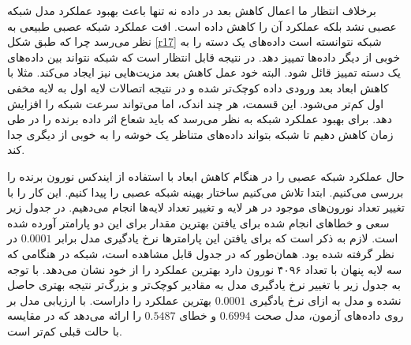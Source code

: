 \documentclass[12pt, a4paper]{article}
\begin{document}
\newpage

برخلاف انتظار ما اعمال کاهش بعد در داده‌ نه تنها باعث بهبود عملکرد مدل شبکه عصبی نشد بلکه عملکرد آن‌ را کاهش داده است.
افت عملکرد شبکه عصبی طبیعی به نظر می‌رسد چرا که طبق شکل \ref{r17} شبکه  نتوانسته‌ است داده‌های یک دسته
را به خوبی از دیگر داده‌ها تمییز دهد. در نتیجه قابل انتظار است که شبکه نتواند بین داده‌های یک دسته تمییز قائل شود.
البته خود عمل کاهش بعد مزیت‌هایی نیز ایجاد می‌کند. مثلا با کاهش ابعاد بعد ورودی داده کوچک‌تر شده و در نتیجه اتصالات لایه
اول به لایه‌ مخفی اول کم‌تر می‌شود. این قسمت، هر چند اندک، اما می‌تواند سرعت شبکه را افزایش دهد. برای بهبود عملکرد شبکه
 به نظر می‌رسد که باید شعاع اثر داده برنده را در طی زمان کاهش دهیم تا شبکه بتواند داده‌های متناظر
یک خوشه را به خوبی از دیگری جدا کند.

حال عملکرد شبکه عصبی را در هنگام کاهش ابعاد با استفاده از ایندکس نورون برنده را بررسی می‌کنیم. ابتدا تلاش می‌کنیم
ساختار بهینه شبکه عصبی را پیدا کنیم. این کار را با تغییر تعداد نورون‌های موجود در هر لایه و تغییر تعداد لایه‌ها
انجام می‌دهیم. در جدول زیر سعی و خطاهای انجام شده برای یافتن بهترین مقدار برای این دو پارامتر آورده شده است.
لازم به ذکر است که برای یافتن این پارامتر‌ها نرخ یادگیری مدل برابر $0.0001$ در نظر گرفته شده بود. همان‌طور که در
جدول قابل مشاهده است، شبکه در هنگامی که سه لایه پنهان با تعداد ۴۰۹۶ نورون دارد بهترین عملکرد را از خود نشان می‌دهد.
با توجه به جدول زیر با تغییر نرخ یادگیری مدل به مقادیر کوچک‌تر و بزرگ‌تر نتیجه بهتری حاصل نشده و
مدل به ازای نرخ یادگیری $0.0001$ بهترین عملکرد را داراست. با ارزیابی مدل بر روی داده‌های آزمون،
مدل صحت $0.6994$ و خطای $0.5487$ را ارائه می‌دهد که در مقایسه با حالت قبلی کم‌تر است.
\end{document}
